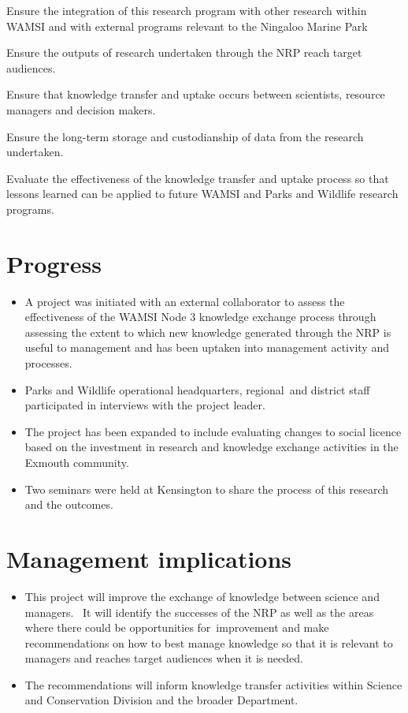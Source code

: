 \documentclass[version=last,
    paper=a4, %
    10pt, %
    usenames,
    dvipsnames,
    oneside, %
    headings=openany, %
    DIV=15 %
]{scrbook}
\begin{document}
Ensure the integration of this research program with other research
within WAMSI and with external programs relevant to the Ningaloo Marine
Park

Ensure the outputs of research undertaken through the NRP reach target
audiences.

Ensure that knowledge transfer and uptake occurs between scientists,
resource managers and decision makers.

Ensure the long-term storage and custodianship of data from the research
undertaken.

Evaluate the effectiveness of the knowledge transfer and uptake process
so that lessons learned can be applied to future WAMSI and Parks and
Wildlife research programs.



\section*{Progress}
\begin{itemize}
\itemsep1pt\parskip0pt
\item
  A project was initiated with an external collaborator to assess the
  effectiveness of the WAMSI Node 3 knowledge exchange process through
  assessing the extent to which new knowledge generated through the NRP
  is useful to management and has been uptaken into management activity
  and processes.
\item
  Parks and Wildlife operational headquarters, regional~and district
  staff participated in interviews with the project leader.
\item
  The project has been expanded to include evaluating changes to social
  licence based on the investment in research and knowledge exchange
  activities in the Exmouth community.
\item
  Two seminars were held at Kensington to share the process of this
  research and the outcomes.
\end{itemize}



\section*{Management implications}
\begin{itemize}
\itemsep1pt\parskip0pt
\item
  This project will improve the exchange of knowledge between science
  and managers. ~It will identify the successes of the NRP as well as
  the areas where there could be opportunities for~improvement and make
  recommendations on how to best manage knowledge so that it is relevant
  to managers and reaches target audiences when it is needed. ~
\item
  The recommendations will inform knowledge transfer activities within
  Science and Conservation Division and the broader Department.~
\end{itemize}
\end{document}
